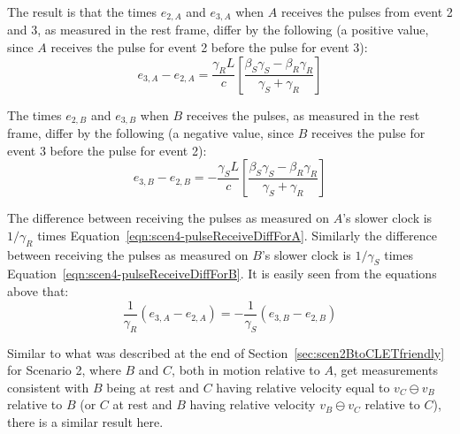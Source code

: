 \documentclass[a4paper]{article}
\theoremstyle{plain}
\theoremstyle{definition}
\begin{document}
The result is that the times $e_{2,A}$ and $e_{3,A}$ when $A$ receives
the pulses from event 2 and 3, as measured in the rest frame, differ
by the following (a positive value, since $A$ receives the pulse for
event 2 before the pulse for event 3):
\begin{equation}
e_{3,A}-e_{2,A}
  = \frac{\gamma_R L}{c} \left[ \frac{\beta_S\gamma_S - \beta_R\gamma_R}{\gamma_S + \gamma_R} \right] \label{eqn:scen4-pulseReceiveDiffForA}
\end{equation}

The times $e_{2,B}$ and $e_{3,B}$ when $B$ receives the pulses, as
measured in the rest frame, differ by the following (a negative value,
since $B$ receives the pulse for event 3 before the pulse for event
2):
\begin{equation}
e_{3,B}-e_{2,B}
  = -\frac{\gamma_S L}{c} \left[ \frac{\beta_S\gamma_S - \beta_R\gamma_R}{\gamma_S + \gamma_R} \right] \label{eqn:scen4-pulseReceiveDiffForB}
\end{equation}

The difference between receiving the pulses as measured on $A$'s
slower clock is $1/\gamma_R$ times
Equation~\eqref{eqn:scen4-pulseReceiveDiffForA}.  Similarly the
difference between receiving the pulses as measured on $B$'s slower
clock is $1/\gamma_S$ times
Equation~\eqref{eqn:scen4-pulseReceiveDiffForB}.  It is easily seen
from the equations above that:
\begin{equation}
\frac{1}{\gamma_R} (e_{3,A}-e_{2,A}) = -\frac{1}{\gamma_S} (e_{3,B}-e_{2,B})
\end{equation}

Similar to what was described at the end of
Section~\ref{sec:scen2BtoCLETfriendly} for Scenario 2, where $B$ and
$C$, both in motion relative to $A$, get measurements consistent with
$B$ being at rest and $C$ having relative velocity equal to $v_C
\ominus v_B$ relative to $B$ (or $C$ at rest and $B$ having relative
velocity $v_B \ominus v_C$ relative to $C$), there is a similar result
here.
\end{document}
